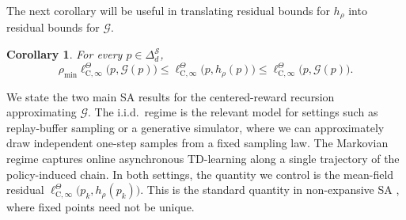 \documentclass{article}
\newtheorem{corollary}[theorem]{Corollary}
\newcommand{\X}{\mathcal{S}}
\begin{document}
The next corollary will be useful in translating residual bounds for $h_\rho$ into residual bounds for $\mathcal G$.
\begin{corollary}\label{corol:residual-conversion}
For every $p \in \Delta^\X_d$,
\begin{equation}
\rho_{\min} \ell^\Theta_{\mathrm C, \infty}\bigl(p, \mathcal G(p)\bigr) \le \ell^\Theta_{\mathrm C, \infty}\bigl(p, h_\rho(p)\bigr) \le \ell^\Theta_{\mathrm C, \infty}\bigl(p, \mathcal G(p)\bigr).
\end{equation}
\end{corollary}

We state the two main SA results for the centered-reward recursion approximating $\mathcal G$. The i.i.d.\ regime is the relevant model for settings such as replay-buffer sampling or a generative simulator, where we can approximately draw independent one-step samples from a fixed sampling law. The Markovian regime captures online asynchronous TD-learning along a single trajectory of the policy-induced chain. In both settings, the quantity we control is the mean-field residual $\ell^\Theta_{\mathrm C, \infty}\bigl(p_k, h_{\rho}(p_k)\bigr)$. This is the standard quantity in non-expansive SA \citep{mann1953mean, bravo2019rates, bravo2024stochastic, blaser2026asymptotic, kim2007robustness}, where fixed points need not be unique.
\end{document}
